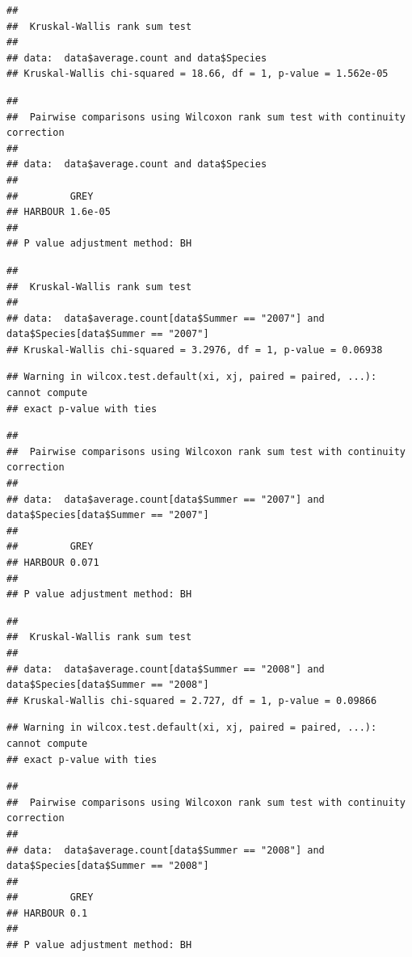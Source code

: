 \documentclass[
]{article}
\begin{document}
\begin{verbatim}
## 
##  Kruskal-Wallis rank sum test
## 
## data:  data$average.count and data$Species
## Kruskal-Wallis chi-squared = 18.66, df = 1, p-value = 1.562e-05
\end{verbatim}

\begin{verbatim}
## 
##  Pairwise comparisons using Wilcoxon rank sum test with continuity correction 
## 
## data:  data$average.count and data$Species 
## 
##         GREY   
## HARBOUR 1.6e-05
## 
## P value adjustment method: BH
\end{verbatim}

\begin{verbatim}
## 
##  Kruskal-Wallis rank sum test
## 
## data:  data$average.count[data$Summer == "2007"] and data$Species[data$Summer == "2007"]
## Kruskal-Wallis chi-squared = 3.2976, df = 1, p-value = 0.06938
\end{verbatim}

\begin{verbatim}
## Warning in wilcox.test.default(xi, xj, paired = paired, ...): cannot compute
## exact p-value with ties
\end{verbatim}

\begin{verbatim}
## 
##  Pairwise comparisons using Wilcoxon rank sum test with continuity correction 
## 
## data:  data$average.count[data$Summer == "2007"] and data$Species[data$Summer == "2007"] 
## 
##         GREY 
## HARBOUR 0.071
## 
## P value adjustment method: BH
\end{verbatim}

\begin{verbatim}
## 
##  Kruskal-Wallis rank sum test
## 
## data:  data$average.count[data$Summer == "2008"] and data$Species[data$Summer == "2008"]
## Kruskal-Wallis chi-squared = 2.727, df = 1, p-value = 0.09866
\end{verbatim}

\begin{verbatim}
## Warning in wilcox.test.default(xi, xj, paired = paired, ...): cannot compute
## exact p-value with ties
\end{verbatim}

\begin{verbatim}
## 
##  Pairwise comparisons using Wilcoxon rank sum test with continuity correction 
## 
## data:  data$average.count[data$Summer == "2008"] and data$Species[data$Summer == "2008"] 
## 
##         GREY
## HARBOUR 0.1 
## 
## P value adjustment method: BH
\end{verbatim}
\end{document}
